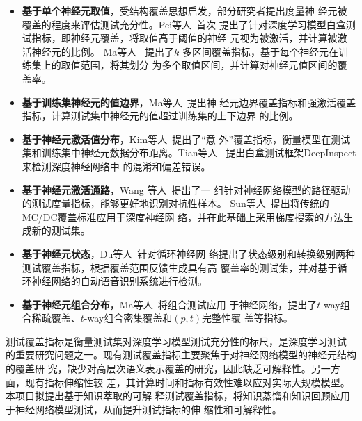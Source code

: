 \begin{itemize}
	\item \textbf{基于单个神经元取值}，受结构覆盖思想启发，部分研究者提出度量神
	      经元被覆盖的程度来评估测试充分性。Pei等人~\cite{Pei2019DeepXplore}首次
	      提出了针对深度学习模型白盒测试指标，即神经元覆盖，将取值高于阈值的神经
	      元视为被激活，并计算被激活神经元的比例。 Ma等人~\cite{ma2018deepgauge}
	      提出了$k$-多区间覆盖指标，基于每个神经元在训练集上的取值范围，将其划分
	      为多个取值区间，并计算对神经元值区间的覆盖率。

	\item \textbf{基于训练集神经元的值边界}，Ma等人~\cite{ma2018deepgauge}提出神
	经元边界覆盖指标和强激活覆盖指标，计算测试集中神经元的值超过训练集的上下边界
	的比例。

	\item \textbf{基于神经元激活值分布}，Kim等人~\cite{Kim2019Guiding}提出了“意
	      外”覆盖指标，衡量模型在测试集和训练集中神经元数据分布距离。Tian等人
	      ~\cite{Tian2019Testing}提出白盒测试框架DeepInspect来检测深度神经网络中
	      的混淆和偏差错误。

	\item \textbf{基于神经元激活通路}，Wang 等人~\cite{Wang2019DeepPath}提出了一
	      组针对神经网络模型的路径驱动的测试度量指标，能够更好地识别对抗性样本。
	      Sun等人~\cite{Sun2018Testing}提出将传统的MC/DC覆盖标准应用于深度神经网
	      络，并在此基础上采用梯度搜索的方法生成新的测试集。

	\item \textbf{基于神经元状态}，Du等人~\cite{Du2018DeepCruiser}针对循环神经网
	      络提出了状态级别和转换级别两种测试覆盖指标，根据覆盖范围反馈生成具有高
	      覆盖率的测试集，并对基于循环神经网络的自动语音识别系统进行检测。

	\item \textbf{基于神经元组合分布}，Ma等人~\cite{ma2019deepct}将组合测试应用
	于神经网络，提出了$t$-way组合稀疏覆盖、$t$-way组合密集覆盖和$(p,t)$完整性覆
	盖等指标。
\end{itemize}

测试覆盖指标是衡量测试集对深度学习模型测试充分性的标尺，是深度学习测试
的重要研究问题之一。{\kaishu 现有测试覆盖指标主要聚焦于对神经网络模型的神经元结构的覆盖研
究，缺少对高层次语义表示覆盖的研究，因此缺乏可解释性。另一方面，现有指标伸缩性较
差，其计算时间和指标有效性难以应对实际大规模模型。本项目拟提出基于知识萃取的可解
释测试覆盖指标，将知识蒸馏和知识回顾应用于神经网络模型测试，从而提升测试指标的伸
缩性和可解释性。}


